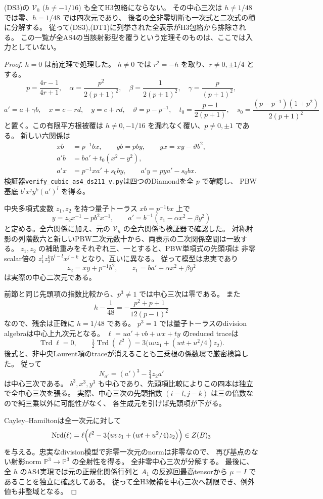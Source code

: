 \begin{theorem}
\label{thm:ds211-V-all-excluded}
(DS3)の $\mathcal V_h$ ($h\ne-1/16$) も全てH3包絡にならない。
その中心三次は $h\ne1/48$ では零、$h=1/48$ では四次元であり、
後者の全非零切断も一次式と二次式の積に分解する。
従って(DS3),(DT1)に列挙された全表示がH3包絡から排除される。
この一覧が全AS4の当該射影型を覆うという定理そのものは、ここでは入力としていない。
\end{theorem}
\begin{proof}
$h=0$ は前定理で処理した。
$h\ne0$ では $r^2=-h$ を取り、$r\ne0,\pm1/4$ とする。
\[
 p=\frac{4r-1}{4r+1},\quad
 \alpha=\frac{p^2}{2(p+1)^2},\quad
 \beta=\frac1{2(p+1)^2},\quad \gamma=\frac{p}{(p+1)^2},
\]
\[
 a'=a+\gamma b,\quad x=c-rd,\quad y=c+rd,\quad
 \vartheta=p-p^{-1},\quad
 t_0=\frac{p-1}{2(p+1)},\quad
 s_0=\frac{(p-p^{-1})(1+p^2)}{2(p+1)^2}
\]
と置く。この有限平方根被覆は $h\ne0,-1/16$ を漏れなく覆い、$p\ne0,\pm1$ である。
新しい六関係は
\[
\begin{split}
 xb&=p^{-1}bx,\qquad yb=pby,\qquad yx=xy-\vartheta b^2,\\
 a'b&=ba'+t_0(x^2-y^2),\\
 a'x&=p^{-1}xa'+s_0by,\qquad
 a'y=pya'-s_0bx.
\end{split}
\]
検証器\texttt{verify\_cubic\_as4\_ds211\_v.py}は四つのDiamondを全 $p$ で確認し、
PBW基底 $b^i x^j y^k(a')^l$ を得る。

中央多項式変数 $z_1,z_2$ を持つ量子トーラス $xb=p^{-1}bx$ 上で
\[
 y=z_2x^{-1}-p b^2x^{-1},\qquad
 a'=b^{-1}(z_1-\alpha x^2-\beta y^2)
\]
と定める。全六関係に加え、元の $\mathcal V_h$ の全六関係も検証器で確認した。
対称射影の列階数六と新しいPBW二次元数十から、両表示の二次関係空間は一致する。
$z_1,z_2$ の補助重みをそれぞれ三、一とすると、PBW単項式の先頭項は
非零scalar倍の $z_1^l z_2^k b^{i-l}x^{j-k}$ となり、互いに異なる。
従って模型は忠実であり
\[
 z_2=xy+p^{-1}b^2,\qquad z_1=ba'+\alpha x^2+\beta y^2
\]
は実際の中心二次元である。

前節と同じ先頭項の指数比較から、$p^3\ne1$ では中心三次は零である。
また
\[
 h-\frac1{48}=-\frac{p^2+p+1}{12(p-1)^2}
\]
なので、残余は正確に $h=1/48$ である。
$p^3=1$ では量子トーラスのdivision algebraは中心上九次元となる。
$\ell=u a'+v b+w x+t y$ のreduced traceは
\[
 \operatorname{Trd}\ell=0,\qquad
 \tfrac12\operatorname{Trd}(\ell^2)
 =3\bigl(uvz_1+(wt+u^2/4)z_2\bigr).
\]
後式と、非中央Laurent項のtraceが消えることも三乗根の係数環で厳密検算した。
従って
\[
 N_{a'}=(a')^3-\tfrac34z_2a'
\]
は中心三次である。
$b^3,x^3,y^3$ も中心であり、先頭項比較によりこの四本は独立で全中心三次を張る。
実際、中心三次の先頭指数 $(i-l,j-k)$ は三の倍数なので純三乗以外に可能性がなく、
各生成元を引けば先頭項が下がる。

Cayley--Hamiltonは全一次元に対して
\[
 \operatorname{Nrd}(\ell)
 =\ell\Bigl(\ell^2-3\bigl(uvz_1+(wt+u^2/4)z_2\bigr)\Bigr)\in Z(B)_3
\]
を与える。忠実なdivision模型で非零一次元のnormは非零なので、
再び基点のない射影norm $\mathbb P^3\to\mathbb P^3$ の全射性を得る。
全非零中心三次が分解する。
最後に、全 $h$ のAS4実現では元の正規化関係行列と $A_1$ の反巡回最高tensorから
$\mu=I$ であることを独立に確認してある。
従って全H3候補を中心三次へ制限でき、例外値も非整域となる。
\end{proof}

